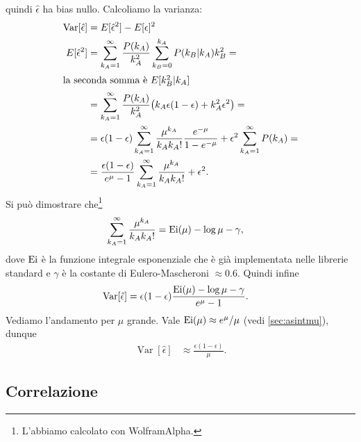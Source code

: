 quindi $\hat\epsilon$ ha bias nullo.
Calcoliamo la varianza:
\begin{align*}
	\operatorname{Var}[\hat\epsilon]
	&= E[\hat\epsilon^2] - E[\epsilon]^2 \\
	E[\hat\epsilon^2]
	&= \sum_{k_A=1}^\infty \frac{P(k_A)}{k_A^2}
	\sum_{k_B=0}^{k_A} P(k_B|k_A) k_B^2 = \\
	\intertext{la seconda somma è $E[k_B^2|k_A]$}
	&= \sum_{k_A=1}^\infty \frac{P(k_A)}{k_A^2}
	\big (k_A\epsilon(1-\epsilon) + k_A^2\epsilon^2 \big) = \\
	&= \epsilon(1-\epsilon) \sum_{k_A=1}^\infty \frac{\mu^{k_A}}{k_Ak_A!}\frac{e^{-\mu}}{1-e^{-\mu}}
	+ \epsilon^2 \sum_{k_A=1}^\infty P(k_A) = \\
	&= \frac{\epsilon(1-\epsilon)}{e^{\mu}-1} \sum_{k_A=1}^\infty \frac{\mu^{k_A}}{k_Ak_A!} + \epsilon^2.
\end{align*}
Si può dimostrare che\footnote{L'abbiamo calcolato con WolframAlpha.}
\begin{align*}
	\sum_{k_A=1}^\infty \frac{\mu^{k_A}}{k_Ak_A!}
	&= \operatorname{Ei}(\mu) - \log\mu - \gamma,
\end{align*}
dove $\operatorname{Ei}$ è la funzione integrale esponenziale che è già implementata nelle librerie standard
e $\gamma$ è la costante di Eulero-Mascheroni $\approx 0.6$.
Quindi infine
\begin{align*}
	\operatorname{Var}[\hat\epsilon]
	&= \epsilon(1-\epsilon)\frac{\operatorname{Ei}(\mu) - \log\mu - \gamma}{e^\mu - 1}.
\end{align*}
Vediamo l'andamento per $\mu$ grande.
Vale $\operatorname{Ei}(\mu) \approx e^{\mu}/\mu$ (vedi \autoref{sec:asintmu}), dunque
\begin{align*}
	\operatorname{Var}[\hat\epsilon]
	&\approx \frac{\epsilon(1-\epsilon)}{\mu}.
\end{align*}

\subsection{Correlazione}
\label{sec:rappcorr}

